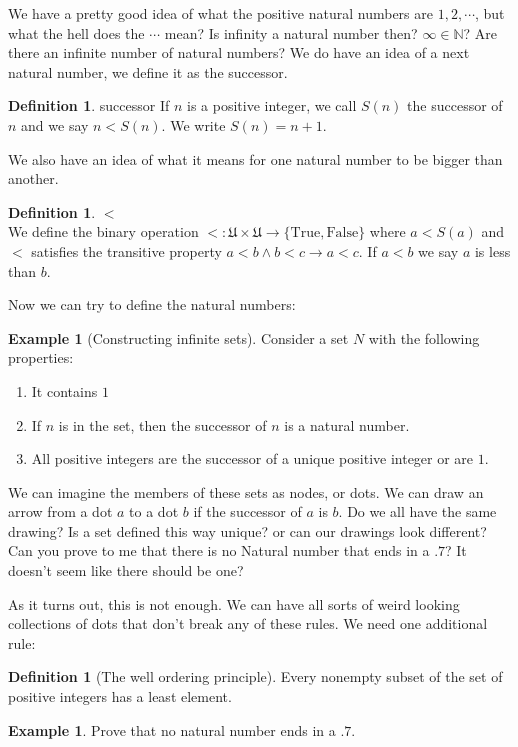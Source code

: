 \documentclass[letterpaper,10pt]{article}
\theoremstyle{plain}
\theoremstyle{definition}
\newtheorem{defn}[thm]{Definition}
\newtheorem{exmp}[thm]{Example}
\theoremstyle{remark}
\providecommand{\land}{\ensuremath{\wedge}}
\begin{document}
We have a pretty good idea of what the positive natural numbers are $1,2,\cdots $, but what the hell does the $\cdots$ mean? Is infinity a natural number then? $\infty\in \mathbb{N}$? Are there an infinite number of natural numbers?
\newline
We do have an idea of a next natural number, we define it as the successor.
\begin{defn}{successor}
If $n$ is a positive integer, we call $S(n)$ the successor of $n$ and we say $n<S(n)$. We write $S(n)=n+1$.
\end{defn}
We also have an idea of what it means for one natural number to be bigger than another. 
\begin{defn}{$<$} $ $ \\
We define the binary operation $<:\mathfrak{U}\times \mathfrak{U}\to \{\text{True},\text{False}\}$ where $ a < S(a)$ and $<$ satisfies the transitive property $a<b\land b<c \to a <c$. If $a < b$ we say $a$ is less than $b$.
\end{defn}
Now we can try to define the natural numbers:
\begin{exmp}[Constructing infinite sets]
Consider a set $N$ with the following properties:
\begin{enumerate}
\item It contains $1$
\item If $n$ is in the set, then the successor of $n$ is a natural number.
\item All positive integers are the successor of a unique positive integer or are $1$.
\end{enumerate}
We can imagine the members of these sets as nodes, or dots. We can draw an arrow from a dot $a$ to a dot $b$ if the successor of $a$ is $b$.
\newline
Do we all have the same drawing? Is a set defined this way unique? or can our drawings look different? Can you prove to me that there is no Natural number that ends in a $.7$? It doesn't seem like there should be one?
\newline
\vspace{2cm}
\end{exmp}


\newpage
As it turns out, this is not enough. We can have all sorts of weird looking collections of dots that don't break any of these rules. We need one additional rule:

\begin{defn}[The well ordering principle]
Every nonempty subset of the set of positive
integers has a least element.
\end{defn}
\begin{exmp} Prove that no natural number ends in a $.7$.
\vspace{3cm}
\end{exmp}
\end{document}
